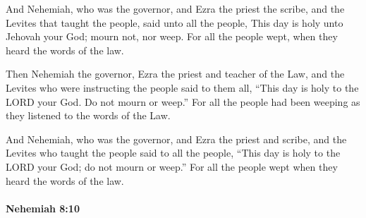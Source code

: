 			\begin{versebox}
					\item[BHS] 
					\item[LXX] 
					\item[ASV] And Nehemiah, who was the governor, and Ezra the priest the scribe, and the Levites that taught the people, said unto all the people, This day is holy unto Jehovah your God; mourn not, nor weep. For all the people wept, when they heard the words of the law.
					\item[NIV] Then Nehemiah the governor, Ezra the priest and teacher of the Law, and the Levites who were instructing the people said to them all, “This day is holy to the LORD your God. Do not mourn or weep.” For all the people had been weeping as they listened to the words of the Law.
					\item[NRSV] And Nehemiah, who was the governor, and Ezra the priest and scribe, and the Levites who taught the people said to all the people, “This day is holy to the LORD your God; do not mourn or weep.” For all the people wept when they heard the words of the law.
			\end{versebox}

		\paragraph{Nehemiah 8:10} %
			\label{NEHEMIAH-8-10}

